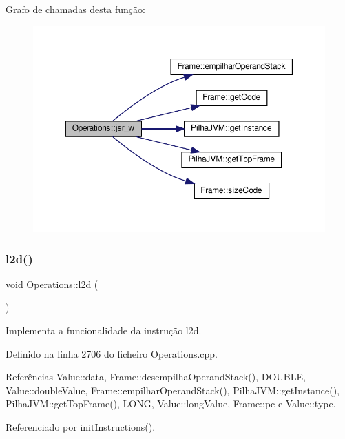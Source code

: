 Grafo de chamadas desta função\+:
\nopagebreak
\begin{figure}[H]
\begin{center}
\leavevmode
\includegraphics[width=350pt]{classOperations_a22241dabd3678c4ab77bbe5882c3a4db_cgraph}
\end{center}
\end{figure}
\mbox{\label{classOperations_aab1532a2f22ab943a1ec37e33ae742b3}} 
\subsubsection{\texorpdfstring{l2d()}{l2d()}}
{\footnotesize\ttfamily void Operations\+::l2d (\begin{DoxyParamCaption}{ }\end{DoxyParamCaption})\hspace{0.3cm}{\ttfamily [private]}}



Implementa a funcionalidade da instrução l2d. 



Definido na linha 2706 do ficheiro Operations.\+cpp.



Referências Value\+::data, Frame\+::desempilha\+Operand\+Stack(), D\+O\+U\+B\+LE, Value\+::double\+Value, Frame\+::empilhar\+Operand\+Stack(), Pilha\+J\+V\+M\+::get\+Instance(), Pilha\+J\+V\+M\+::get\+Top\+Frame(), L\+O\+NG, Value\+::long\+Value, Frame\+::pc e Value\+::type.



Referenciado por init\+Instructions().

